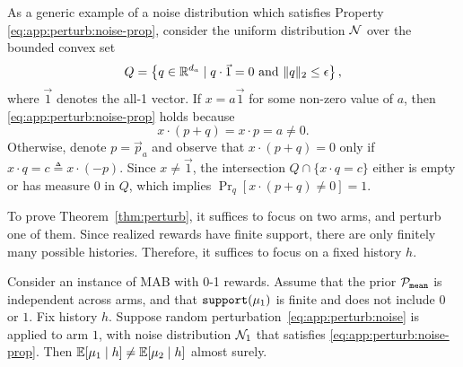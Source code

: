 \begin{remark}
As a generic example of a noise distribution which satisfies
  Property \eqref{eq:app:perturb:noise-prop}, consider the uniform
  distribution $\mathcal{N}$ over the bounded convex set
  \[ Q = \left\{q \in \mathbb{R}^{d_a} \mid q \cdot \vec{1} = 0 \mbox{ and }
      \|q\|_2 \leq \epsilon\right\}, \] where $\vec{1}$ denotes the all-1
  vector. If $x = a \vec{1}$ for some non-zero value of $a$, then
  \eqref{eq:app:perturb:noise-prop} holds because
  $$x \cdot (p+q) = x \cdot p = a\neq 0.$$ Otherwise, denote
  $p=\vec{p}_a$ and observe that $x\cdot({p}+ {q}) = 0$ only if
  $x \cdot q = c \triangleq x \cdot (-p)$. Since $x\neq \vec{1}$, the
  intersection $Q\cap\{ x\cdot q = c \}$ either is empty or has
  measure 0 in $Q$, which implies
  $\Pr_{{q}}\left[ x\cdot({p}+ {q}) \neq 0 \right] =1$.
\end{remark}


To prove Theorem~\ref{thm:perturb}, it suffices to focus on two arms, and perturb one of them. Since realized rewards have finite support, there are only finitely many possible histories. Therefore, it suffices to focus on a fixed history $h$.

\begin{lemma}\label{lm:perturb}
Consider an instance of MAB with 0-1 rewards. Assume that the prior $\mathcal{P}_\mathtt{mean}$ is independent across arms, and that $\mathtt{support}(\mu_1)$ is finite and does not include $0$ or $1$. Fix history $h$. Suppose random perturbation~\eqref{eq:app:perturb:noise} is applied to arm $1$, with noise distribution $\mathcal{N}_1$ that satisfies \eqref{eq:app:perturb:noise-prop}. Then
    $\E[\mu_1\mid h] \neq \E[\mu_2\mid h] $
almost surely.
\end{lemma}

